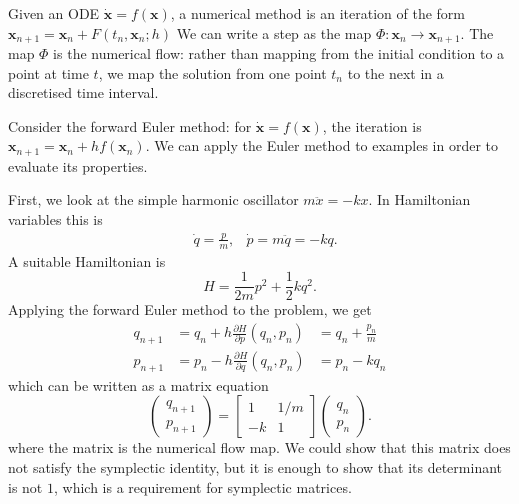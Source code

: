 \documentclass{report}
\begin{document}
Given an ODE $\dot{\mathbf{x}} = f(\mathbf{x})$, a numerical method is an iteration of the form $\mathbf{x}_{n+1} = \mathbf{x}_n + F(t_n, \mathbf{x}_n; h)$
We can write a step as the map $\Phi: \mathbf{x}_n \rightarrow \mathbf{x}_{n+1}$. The map $\Phi$ is the numerical flow:
rather than mapping from the initial condition to a point at time $t$, we map the solution from one point $t_n$ to the next in a discretised time interval.

Consider the forward Euler method: for $\dot{\mathbf{x}} = f(\mathbf{x})$, the iteration is $\mathbf{x}_{n+1} = \mathbf{x}_n + hf(\mathbf{x}_n)$.
We can apply the Euler method to examples in order to evaluate its properties.

First, we look at the simple harmonic oscillator $m \ddot{x} = -k x$.
In Hamiltonian variables this is
\begin{equation*}
	\begin{aligned}
		&\dot{q} = \frac{p}{m}, &\dot{p} = m\ddot{q} = -kq.
	\end{aligned}
\end{equation*}
A suitable Hamiltonian is
\begin{equation*}
	H = \frac{1}{2m}p^2 + \frac{1}{2}kq^2.
\end{equation*}
Applying the forward Euler method to the problem, we get
\begin{equation*}
	\begin{aligned}
		q_{n+1} &= q_n + h\frac{\partial H}{\partial p}(q_n, p_n) &= q_n + \frac{p_n}{m}\\
		p_{n+1} &= p_n - h\frac{\partial H}{\partial q}(q_n, p_n) &= p_n - kq_n
	\end{aligned}
\end{equation*}
which can be written as a matrix equation
\begin{equation*}
	\begin{pmatrix}
		q_{n+1} \\
		p_{n+1}
	\end{pmatrix} = \begin{bmatrix}
		1 & 1/m \\
		-k & 1
	\end{bmatrix} \begin{pmatrix}
		q_n \\
		p_n
	\end{pmatrix}.
\end{equation*}
where the matrix is the numerical flow map.
We could show that this matrix does not satisfy the symplectic identity,
but it is enough to show that its determinant is not $1$, which is a requirement for symplectic matrices.
\end{document}
